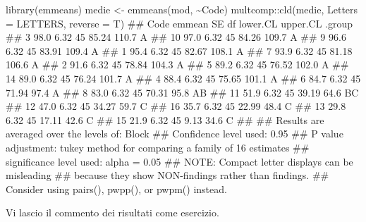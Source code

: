 \documentclass[a4paper,12pt,oneside]{book}
\newenvironment{Shaded}{\begin{snugshade}}{\end{snugshade}}
\newcommand{\SpecialCharTok}[1]{#1}
\newcommand{\DocumentationTok}[1]{#1}
\newcommand{\OtherTok}[1]{#1}
\newcommand{\FunctionTok}[1]{#1}
\newcommand{\AttributeTok}[1]{#1}
\newcommand{\AlertTok}[1]{#1}
\newcommand{\NormalTok}[1]{#1}
\begin{document}
\begin{Shaded}
\begin{Highlighting}[]
\FunctionTok{library}\NormalTok{(emmeans)}
\NormalTok{medie }\OtherTok{\textless{}{-}} \FunctionTok{emmeans}\NormalTok{(mod, }\SpecialCharTok{\textasciitilde{}}\NormalTok{Code)}
\NormalTok{multcomp}\SpecialCharTok{::}\FunctionTok{cld}\NormalTok{(medie, }\AttributeTok{Letters =}\NormalTok{ LETTERS, }\AttributeTok{reverse =}\NormalTok{ T)}
\DocumentationTok{\#\#  Code emmean   SE df lower.CL upper.CL .group}
\DocumentationTok{\#\#  3      98.0 6.32 45    85.24    110.7  A    }
\DocumentationTok{\#\#  10     97.0 6.32 45    84.26    109.7  A    }
\DocumentationTok{\#\#  9      96.6 6.32 45    83.91    109.4  A    }
\DocumentationTok{\#\#  1      95.4 6.32 45    82.67    108.1  A    }
\DocumentationTok{\#\#  7      93.9 6.32 45    81.18    106.6  A    }
\DocumentationTok{\#\#  2      91.6 6.32 45    78.84    104.3  A    }
\DocumentationTok{\#\#  5      89.2 6.32 45    76.52    102.0  A    }
\DocumentationTok{\#\#  14     89.0 6.32 45    76.24    101.7  A    }
\DocumentationTok{\#\#  4      88.4 6.32 45    75.65    101.1  A    }
\DocumentationTok{\#\#  6      84.7 6.32 45    71.94     97.4  A    }
\DocumentationTok{\#\#  8      83.0 6.32 45    70.31     95.8  AB   }
\DocumentationTok{\#\#  11     51.9 6.32 45    39.19     64.6   BC  }
\DocumentationTok{\#\#  12     47.0 6.32 45    34.27     59.7    C  }
\DocumentationTok{\#\#  16     35.7 6.32 45    22.99     48.4    C  }
\DocumentationTok{\#\#  13     29.8 6.32 45    17.11     42.6    C  }
\DocumentationTok{\#\#  15     21.9 6.32 45     9.13     34.6    C  }
\DocumentationTok{\#\# }
\DocumentationTok{\#\# Results are averaged over the levels of: Block }
\DocumentationTok{\#\# Confidence level used: 0.95 }
\DocumentationTok{\#\# P value adjustment: tukey method for comparing a family of 16 estimates }
\DocumentationTok{\#\# significance level used: alpha = 0.05 }
\DocumentationTok{\#\# }\AlertTok{NOTE}\DocumentationTok{: Compact letter displays can be misleading}
\DocumentationTok{\#\#       because they show NON{-}findings rather than findings.}
\DocumentationTok{\#\#       Consider using \textquotesingle{}pairs()\textquotesingle{}, \textquotesingle{}pwpp()\textquotesingle{}, or \textquotesingle{}pwpm()\textquotesingle{} instead.}
\end{Highlighting}
\end{Shaded}

\normalsize

Vi lascio il commento dei risultati come esercizio.
\end{document}
